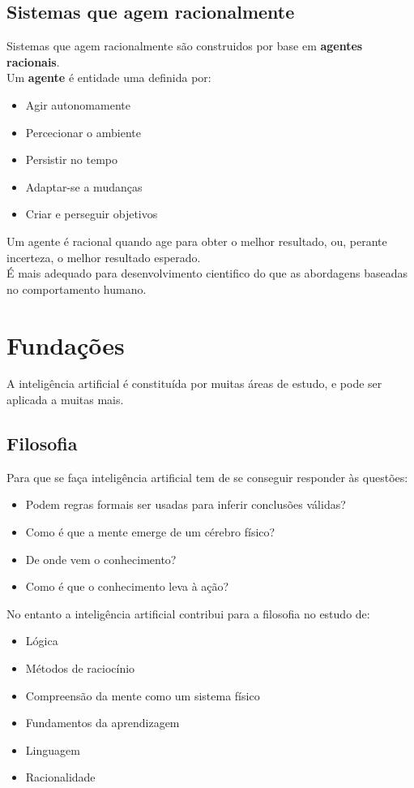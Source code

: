 \documentclass[]{report}
\begin{document}
\subsection{Sistemas que agem racionalmente}
Sistemas que agem racionalmente são construidos por base em \textbf{agentes racionais}.\\
Um \textbf{agente} é entidade uma definida por:
\begin{itemize}
\item Agir autonomamente
\item Percecionar o ambiente
\item Persistir no tempo
\item Adaptar-se a mudanças
\item Criar e perseguir objetivos
\end{itemize}
Um agente é racional quando age para obter o melhor resultado, ou, perante incerteza, o melhor resultado esperado.\\
É mais adequado para desenvolvimento cientifico do que as abordagens baseadas no comportamento humano.
\section{Fundações}
A inteligência artificial é constituída por muitas áreas de estudo, e pode ser aplicada a muitas mais. 
\subsection{Filosofia}
Para que se faça inteligência artificial tem de se conseguir responder às questões:
\begin{itemize}
\item Podem regras formais ser usadas para inferir conclusões válidas?
\item Como é que a mente emerge de um cérebro físico?
\item De onde vem o conhecimento?
\item Como é que o conhecimento leva à ação?
\end{itemize}
No entanto a inteligência artificial contribui para a filosofia no estudo de:
\begin{itemize}
\item Lógica
\item Métodos de raciocínio
\item Compreensão da mente como um sistema físico
\item Fundamentos da aprendizagem
\item Linguagem
\item Racionalidade
\end{itemize}
\end{document}
